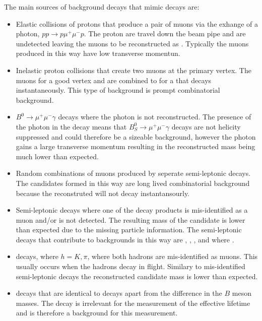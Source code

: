 The main sources of background decays that mimic \bsmumu decays are:
\begin{itemize}
\item Elastic collisions of protons that produce a pair of muons via the exhange of a photon, $pp \to p \mu^{+} \mu^{-} p$. The proton are travel down the beam pipe and are undetected leaving the muons to be reconstructed as \bsmumu. Typically the muons produced in this way have low transverse momentun. %
\item Inelastic proton collisions that create two muons at the primary vertex. The muons for a good vertex and are combined to for a \bs that decays instantaneously. This type of background is prompt combinatorial background. 
\item $B_{}^{0}\to\mu^{+}\mu^{-}\gamma$ decays where the photon is not reconstructed. The presence of the photon in the decay means that $B_{S}^{0}\to\mu^{+}\mu^{-}\gamma$ decays are not helicity suppressed and could therefore be a sizeable background, however the photon gains a large transverse momentum resulting in the reconstructed \bs mass being much lower than expected.
\item Random combinations of muons produced by seperate semi-leptonic decays. The \bsmumu candidates formed in this way are long lived combinatorial background because the reconstruted \bs will not decay instantansourly. %
\item Semi-leptonic decays where one of the decay products is mis-identified as a muon and/or is not detected. The resulting mass of the \bs candidate is lower than expected due to the missing particle information. The semi-leptonic decays that contribute to \bsmumu backgrounds in this way are \bdpimunu, \bsKmunu, \bpimumu, \bdpimumu and \bcjpsimunu where \jpsimumu.
\item \bhh decays, where $ h  = K, \pi$, where both hadrons are mis-identified as muons. This usually occurs when the hadrons decay in flight. Similary to mis-identified semi-leptonic decays the reconstructed \bs candidate mass is lower than expected.
\item \bdmumu decays that are identical to \bsmumu decays apart from the difference in the $B$ meson masses. The \bd decay is irrelevant for the measurement of the \bsmumu effective lifetime and is therefore a background for this measurement.
\end{itemize}

